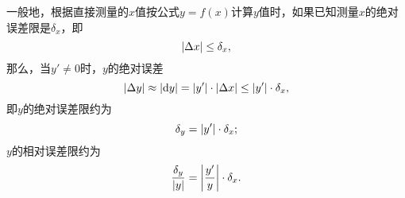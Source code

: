 一般地，根据直接测量的\(x\)值按公式\(y = f(x)\)计算\(y\)值时，如果已知测量\(x\)的绝对误差限是\(\delta_x\)，即\[
\abs{\Delta x} \leq \delta_x,
\]那么，当\(y' \neq 0\)时，\(y\)的绝对误差\[
\abs{\Delta y} \approx \abs{\dd{y}} = \abs{y'} \cdot \abs{\Delta x} \leq \abs{y'} \cdot \delta_x,
\]即\(y\)的绝对误差限约为\[
\delta_y = \abs{y'} \cdot \delta_x;
\]\(y\)的相对误差限约为\[
\frac{\delta_y}{\abs{y}} = \abs{\frac{y'}{y}} \cdot \delta_x.
\]
